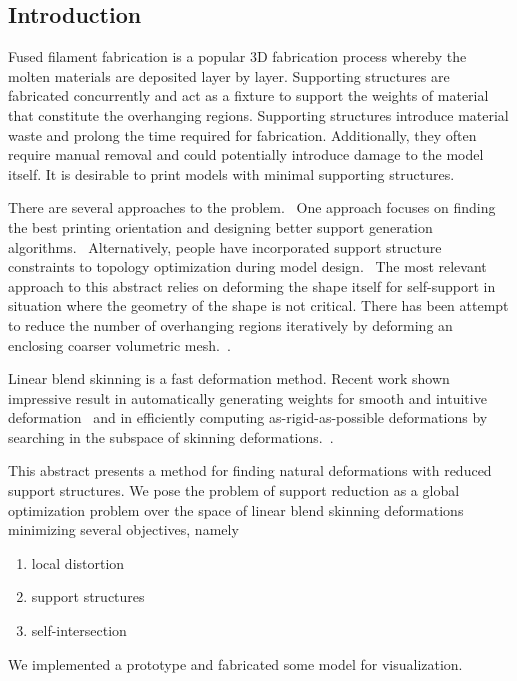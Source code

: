 
\subsection*{Introduction}

Fused filament fabrication is a popular 3D fabrication process whereby the molten materials are deposited layer by layer. Supporting structures are fabricated concurrently and act as a fixture to support the weights of material that constitute the overhanging regions. Supporting structures introduce material waste and prolong the time required for fabrication. Additionally, they often require manual removal and could potentially introduce damage to the model itself. It is desirable to print models with minimal supporting structures.

There are several approaches to the problem.~\cite{jiang_xu_stringer_2018} One approach focuses on finding the best printing orientation and designing better support generation algorithms.~\cite{vanek_galicia_benes_2014} Alternatively, people have incorporated support structure constraints to topology optimization during model design.~\cite{langelaar_2016} The most relevant approach to this abstract relies on deforming the shape itself for self-support in situation where the geometry of the shape is not critical. There has been attempt to reduce the number of overhanging regions iteratively by deforming an enclosing coarser volumetric mesh.~\cite{hu_jin_wang_2015}.

Linear blend skinning is a fast deformation method. Recent work shown impressive result in automatically generating weights for smooth and intuitive deformation~\cite{jacobson_bounded_biharmonic_weights_2011} and in efficiently computing as-rigid-as-possible deformations by searching in the subspace of skinning deformations.~\cite{jacobson_fast_2012}.

This abstract presents a method for finding natural deformations with reduced support structures. We pose the problem of support reduction as a global optimization problem over the space of linear blend skinning deformations minimizing several objectives, namely
\begin{enumerate}
    \item local distortion ~\cite{sorkine_arap_2007}
    \item support structures
    \item self-intersection
\end{enumerate}
We implemented a prototype and fabricated some model for visualization.

